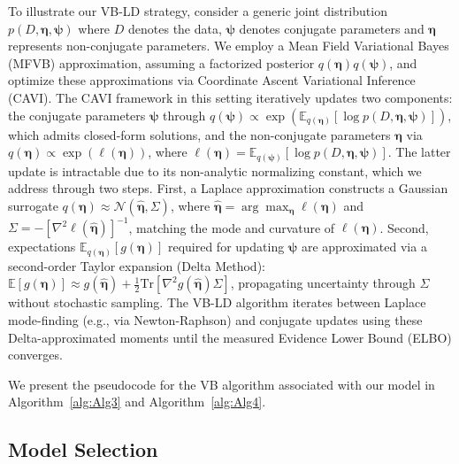 \documentclass[APA,STIX1COL]{WileyNJD-v2}
\begin{document}
To illustrate our VB-LD strategy, consider a generic joint distribution \( p(D,\boldsymbol{\eta}, \boldsymbol{\psi}) \) where $D$ denotes the data, \( \boldsymbol{\psi} \) denotes conjugate parameters and \( \boldsymbol{\eta} \) represents non-conjugate parameters. We employ a Mean Field Variational Bayes (MFVB) approximation, assuming a factorized posterior \( q(\boldsymbol{\eta})q(\boldsymbol{\psi}) \), and optimize these approximations via Coordinate Ascent Variational Inference (CAVI). The CAVI framework in this setting iteratively updates two components: the conjugate parameters \( \boldsymbol{\psi} \) through \( q(\boldsymbol{\psi}) \propto \exp\left(\mathbb{E}_{q(\boldsymbol{\eta})}[\log p(D, \boldsymbol{\eta}, \boldsymbol{\psi})]\right) \), which admits closed-form solutions, and the non-conjugate parameters \( \boldsymbol{\eta} \) via \( q(\boldsymbol{\eta}) \propto \exp(\ell(\boldsymbol{\eta})) \), where \( \ell(\boldsymbol{\eta}) = \mathbb{E}_{q(\boldsymbol{\psi})}[\log p(D, \boldsymbol{\eta}, \boldsymbol{\psi})] \). The latter update is intractable due to its non-analytic normalizing constant, which we address through two steps. First, a Laplace approximation constructs a Gaussian surrogate \( q(\boldsymbol{\eta}) \approx \mathcal{N}(\hat{\boldsymbol{\eta}}, \Sigma) \), where \( \hat{\boldsymbol{\eta}} = \arg\max_{\boldsymbol{\eta}} \ell(\boldsymbol{\eta}) \) and \( \Sigma = -\left[\nabla^2 \ell(\hat{\boldsymbol{\eta}})\right]^{-1} \), matching the mode and curvature of \( \ell(\boldsymbol{\eta}) \). Second, expectations \( \mathbb{E}_{q(\boldsymbol{\eta})}[g(\boldsymbol{\eta})] \) required for updating \( \boldsymbol{\psi} \) are approximated via a second-order Taylor expansion (Delta Method): \( \mathbb{E}[g(\boldsymbol{\eta})] \approx g(\hat{\boldsymbol{\eta}}) + \frac{1}{2}\text{Tr}\left[\nabla^2 g(\hat{\boldsymbol{\eta}}) \Sigma\right] \), propagating uncertainty through \( \Sigma \) without stochastic sampling. The VB-LD algorithm iterates between Laplace mode-finding (e.g., via Newton-Raphson) and conjugate updates using these Delta-approximated moments until the measured Evidence Lower Bound (ELBO) converges.

We present the pseudocode for the VB algorithm associated with our model in Algorithm~\ref{alg:Alg3} and Algorithm~\ref{alg:Alg4}.

\subsection{Model Selection}
\label{subsec:modelselection}
\end{document}
